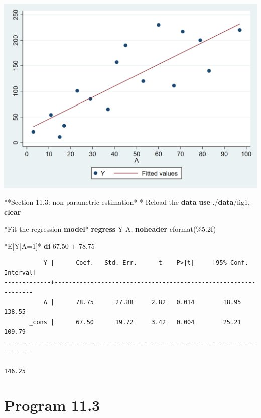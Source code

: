 \documentclass[
  10pt,
]{book}
\newenvironment{Shaded}{\begin{snugshade}}{\end{snugshade}}
\newcommand{\KeywordTok}[1]{\textcolor[rgb]{0.13,0.29,0.53}{\textbf{#1}}}
\newcommand{\NormalTok}[1]{#1}
\begin{document}
\begin{center}\includegraphics[width=0.85\linewidth]{figs/stata-fig-11-4} \end{center}

\begin{Shaded}
\begin{Highlighting}[]
\NormalTok{**Section 11.3: non{-}parametric estimation*}
\NormalTok{* Reload the }\KeywordTok{data}
\KeywordTok{use}\NormalTok{ ./}\KeywordTok{data}\NormalTok{/fig1, }\KeywordTok{clear}

\NormalTok{*Fit the regression }\KeywordTok{model}\NormalTok{*}
\KeywordTok{regress}\NormalTok{ Y A, }\KeywordTok{noheader}\NormalTok{ cformat(\%5.2f)}

\NormalTok{*E[Y|A=1]*}
\KeywordTok{di}\NormalTok{ 67.50 + 78.75}
\end{Highlighting}
\end{Shaded}

\begin{verbatim}
           Y |      Coef.   Std. Err.      t    P>|t|     [95% Conf. Interval]
-------------+----------------------------------------------------------------
           A |      78.75      27.88     2.82   0.014        18.95      138.55
       _cons |      67.50      19.72     3.42   0.004        25.21      109.79
------------------------------------------------------------------------------

146.25
\end{verbatim}

\hypertarget{program-11.3-1}{%
\section{Program 11.3}\label{program-11.3-1}}
\end{document}
